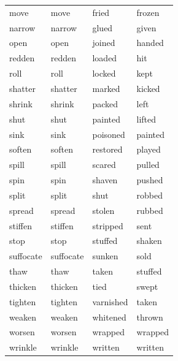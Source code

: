 \documentclass[output=paper]{langsci/langscibook}
\begin{document}
\begin{subappendices}
{\begin{tabularx}{\textwidth}{XXXX}
move      & move      & fried      & frozen\\
narrow    & narrow    & glued      & given\\
open      & open      & joined     & handed\\
redden    & redden    & loaded     & hit\\
roll      & roll      & locked     & kept\\
shatter   & shatter   & marked    & kicked\\
shrink    & shrink    & packed    & left\\
shut      & shut      & painted   & lifted\\
sink      & sink      & poisoned  & painted\\
soften    & soften    & restored  & played\\
spill     & spill     & scared    & pulled\\
spin      & spin      & shaven    & pushed\\
split     & split     & shut      & robbed\\
spread    & spread    & stolen    & rubbed\\
stiffen   & stiffen   & stripped  & sent\\
stop      & stop      & stuffed   & shaken\\
suffocate & suffocate & sunken    & sold\\
thaw      & thaw      & taken     & stuffed\\
thicken   & thicken   & tied      & swept\\
tighten   & tighten   & varnished & taken\\
weaken    & weaken    & whitened  & thrown\\
worsen    & worsen    & wrapped   & wrapped\\
wrinkle   & wrinkle   & written   & written\\
\end{tabularx}
}


\end{subappendices}
\end{document}
